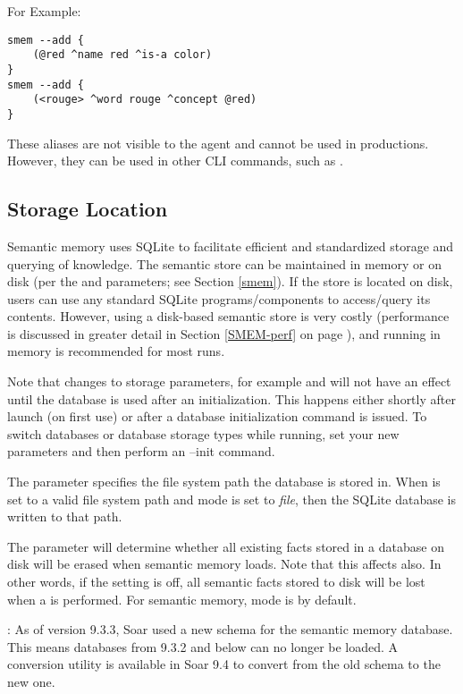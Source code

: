 For Example:

\begin{verbatim}
smem --add {
    (@red ^name red ^is-a color)
}
smem --add {
    (<rouge> ^word rouge ^concept @red)
}
\end{verbatim}

These aliases are not visible to the agent and cannot be used in productions.
However, they can be used in other CLI commands, such as .

\subsection{Storage Location}

Semantic memory uses SQLite to facilitate efficient and standardized storage and querying of knowledge.
The semantic store can be maintained in memory or on disk (per the  and  parameters; see Section \ref{smem}).
If the store is located on disk, users can use any standard SQLite programs/components to access/query its contents.
However, using a disk-based semantic store is very costly (performance is discussed in greater detail in Section \ref{SMEM-perf} on page \pageref{SMEM-perf}), and running in memory is recommended for most runs.

Note that changes to storage parameters, for example  and  will not have an effect until the database is used after an initialization. This happens either shortly after launch (on first use) or after a database initialization command is issued. To switch databases or database storage types while running, set your new parameters and then perform an --init command.

The  parameter specifies the file system path the database is stored in. When  is set to a valid file system path and  mode is set to \emph{file}, then the SQLite database is written to that path.

The  parameter will determine whether all existing facts stored in a database on disk will be erased when semantic memory loads. Note that this affects  also.  In other words, if the  setting is off, all semantic facts stored to disk will be lost when a  is performed. For semantic memory,  mode is  by default.

: As of version 9.3.3, Soar used a new schema for the semantic memory database. This means databases from 9.3.2 and below can no longer be loaded.  A conversion utility is available in Soar 9.4 to convert from the old schema to the new one.

